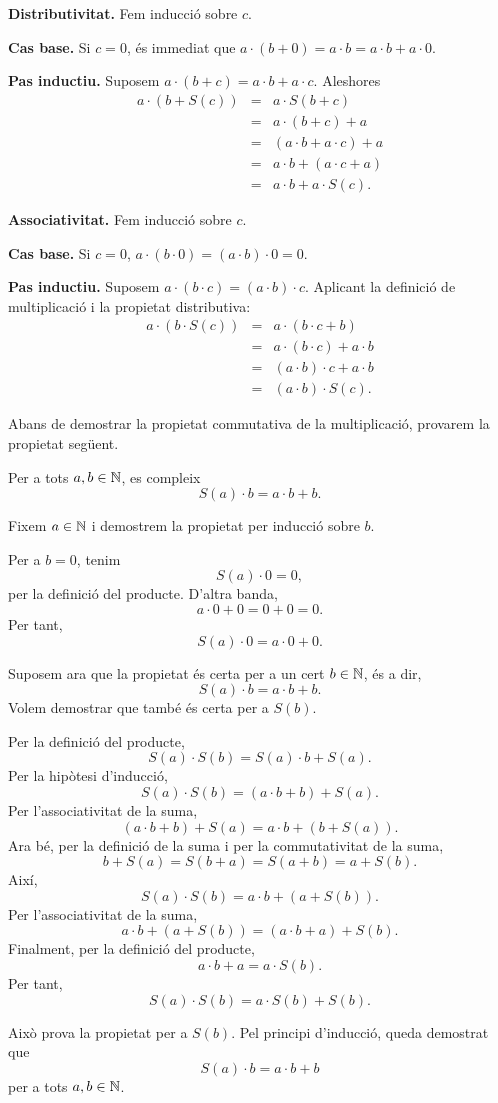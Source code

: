 \begin{prova}
\textbf{Distributivitat.} Fem inducció sobre $c$.

\textbf{Cas base.} Si $c=0$, és immediat que $a\cdot (b+0)=a\cdot b=a\cdot b+a\cdot 0$.

\textbf{Pas inductiu.} Suposem $a\cdot (b+c)=a\cdot b+a\cdot c$. Aleshores
\[
\begin{array}{lll}
a\cdot (b+S(c)) &=& a\cdot S(b+c)\\
&=& a\cdot (b+c)+a\\
&=& (a\cdot b+a\cdot c)+a\\
&=& a\cdot b+(a\cdot c+a)\\
&=& a\cdot b+a\cdot S(c).
\end{array}
\]

\textbf{Associativitat.} Fem inducció sobre $c$.

\textbf{Cas base.} Si $c=0$, $a\cdot (b\cdot 0)=(a\cdot b)\cdot 0=0$.

\textbf{Pas inductiu.} Suposem $a\cdot (b\cdot c)=(a\cdot b)\cdot c$. Aplicant la definició de multiplicació i la propietat distributiva:
\[
\begin{array}{lll}
a\cdot (b\cdot S(c)) &=& a\cdot (b\cdot c+b)\\
&=& a\cdot (b\cdot c)+a\cdot b\\
&=& (a\cdot b)\cdot c+a\cdot b\\
&=& (a\cdot b)\cdot S(c).
\end{array}
\]
\end{prova}

Abans de demostrar la propietat commutativa de la multiplicació, provarem la propietat següent.

\begin{proposicio}\label{prop:successor-producte-primer-factor}
Per a tots $a,b\in\mathbb{N}$, es compleix
\[
S(a)\cdot b=a\cdot b+b.
\]
\end{proposicio}

\begin{prova}
Fixem $a\in\mathbb{N}$ i demostrem la propietat per inducció sobre $b$.

Per a $b=0$, tenim
\[
S(a)\cdot 0=0,
\]
per la definició del producte. D'altra banda,
\[
a\cdot 0+0=0+0=0.
\]
Per tant,
\[
S(a)\cdot 0=a\cdot 0+0.
\]

Suposem ara que la propietat és certa per a un cert $b\in\mathbb{N}$, és a dir,
\[
S(a)\cdot b=a\cdot b+b.
\]
Volem demostrar que també és certa per a $S(b)$.

Per la definició del producte,
\[
S(a)\cdot S(b)=S(a)\cdot b+S(a).
\]
Per la hipòtesi d'inducció,
\[
S(a)\cdot S(b)=(a\cdot b+b)+S(a).
\]
Per l'associativitat de la suma,
\[
(a\cdot b+b)+S(a)=a\cdot b+(b+S(a)).
\]
Ara bé, per la definició de la suma i per la commutativitat de la suma,
\[
b+S(a)=S(b+a)=S(a+b)=a+S(b).
\]
Així,
\[
S(a)\cdot S(b)=a\cdot b+(a+S(b)).
\]
Per l'associativitat de la suma,
\[
a\cdot b+(a+S(b))=(a\cdot b+a)+S(b).
\]
Finalment, per la definició del producte,
\[
a\cdot b+a=a\cdot S(b).
\]
Per tant,
\[
S(a)\cdot S(b)=a\cdot S(b)+S(b).
\]

Això prova la propietat per a $S(b)$. Pel principi d'inducció, queda demostrat que
\[
S(a)\cdot b=a\cdot b+b
\]
per a tots $a,b\in\mathbb{N}$.
\end{prova}

